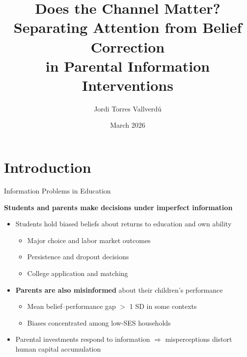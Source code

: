 \documentclass[aspectratio=169,11pt]{beamer}
\title[Information \& Parental Investment]{Does the Channel Matter?\\[4pt]
\small Separating Attention from Belief Correction\\in Parental Information Interventions}
\author{Jordi Torres Vallverd\'{u}}
\institute{MRes TSE --- Behavioral Development Economics}
\date{March 2026}
\begin{document}
\begin{frame}
\titlepage
\end{frame}



\section{Introduction}

\begin{frame}{Information Problems in Education}

\textbf{Students and parents make decisions under imperfect information}

\begin{itemize}
    \item Students hold biased beliefs about returns to education and own ability
    \begin{itemize}
        \item Major choice and labor market outcomes \citep{arcidiacono2024recovering,wiswall2015determinants}
        \item Persistence and dropout decisions \citep{stinebrickner2012learning,arcidiacono2016college}
        \item College application and matching \citep{larroucau2024application}
    \end{itemize}

    \medskip

    \item \textbf{Parents are also misinformed} about their children's performance
    \begin{itemize}
        \item Mean belief--performance gap $>$ 1 SD in some contexts \citep{dizonross2019parents}
        \item Biases concentrated among low-SES households
    \end{itemize}

    \medskip

    \item Parental investments respond to information $\Rightarrow$ misperceptions distort human capital accumulation
\end{itemize}

\end{frame}
\end{document}
